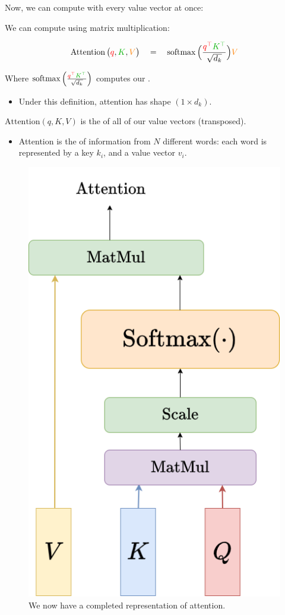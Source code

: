             

        Now, we can compute with every value vector at once:
        \\

        \begin{kequation}
            We can compute  using matrix multiplication:

            \begin{equation*}
                \operatorname{Attention} \big( \red{q},\grn{K},\org{V} \big) 
                \quad=\quad 
                \operatorname{softmax} \Big( \frac{ \red{q^\top}\grn{K^\top} }{\sqrt{d_k}} \Big) 
                \org{V} 
            \end{equation*}

            Where $\operatorname{softmax} \Big( \frac{ \red{q^\top}\grn{K^\top} }{\sqrt{d_k}} \Big)$ computes our .

            \begin{itemize}
                \item Under this definition, attention has shape $(1 \times d_k )$.
            \end{itemize}
        \end{kequation}

        \phantom{}

        \begin{definition}
            $\text{Attention}(q,K,V)$ is the  of all of our value vectors (transposed).

            \begin{itemize}
                \item Attention is the  of  information from $N$ different words: each word is represented by a key $k_i$, and a value vector $v_i$.
            \end{itemize}
        \end{definition}

            

        \begin{figure}[H]
            \centering
            \includegraphics[width=0.3\linewidth]{images/transformers_images/condensed_attention.png}
            \caption*{We now have a completed representation of attention.}
        \end{figure}

